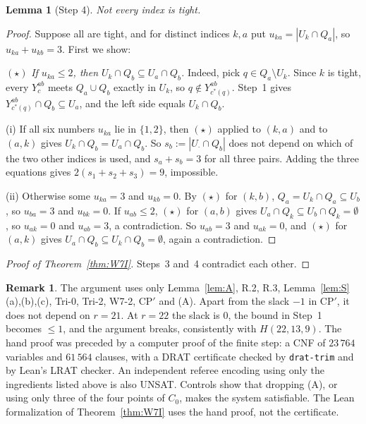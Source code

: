 \documentclass[11pt]{amsart}
\newtheorem{lemma}[theorem]{Lemma}
\theoremstyle{definition}
\newtheorem{remark}[theorem]{Remark}
\begin{document}
\begin{lemma}[Step 4]\label{lem:step4}
Not every index is tight.
\end{lemma}
\begin{proof}
Suppose all are tight, and for distinct indices $k,a$ put $u_{ka}=|U_k\cap Q_a|$, so $u_{ka}+u_{kb}=3$. First we show:

$(\star)$ \emph{If $u_{ka}\le 2$, then $U_k\cap Q_b\subseteq U_a\cap Q_b$.} Indeed, pick $q\in Q_a\setminus U_k$. Since $k$ is tight, every $Y^{ab}_c$ meets $Q_a\cup Q_b$ exactly in $U_k$, so $q\notin Y^{ab}_{c^*(q)}$. Step~1 gives $Y^{ab}_{c^*(q)}\cap Q_b\subseteq U_a$, and the left side equals $U_k\cap Q_b$.

(i) If all six numbers $u_{ka}$ lie in $\{1,2\}$, then $(\star)$ applied to $(k,a)$ and to $(a,k)$ gives $U_k\cap Q_b=U_a\cap Q_b$. So $s_b:=|U_\cdot\cap Q_b|$ does not depend on which of the two other indices is used, and $s_a+s_b=3$ for all three pairs. Adding the three equations gives $2(s_1+s_2+s_3)=9$, impossible.

(ii) Otherwise some $u_{ka}=3$ and $u_{kb}=0$. By $(\star)$ for $(k,b)$, $Q_a=U_k\cap Q_a\subseteq U_b$, so $u_{ba}=3$ and $u_{bk}=0$. If $u_{ab}\le 2$, $(\star)$ for $(a,b)$ gives $U_a\cap Q_k\subseteq U_b\cap Q_k=\emptyset$, so $u_{ak}=0$ and $u_{ab}=3$, a contradiction. So $u_{ab}=3$ and $u_{ak}=0$, and $(\star)$ for $(a,k)$ gives $U_a\cap Q_b\subseteq U_k\cap Q_b=\emptyset$, again a contradiction.
\end{proof}

\begin{proof}[Proof of Theorem~\ref{thm:W7I}]
Steps~3 and~4 contradict each other.
\end{proof}

\begin{remark}
The argument uses only Lemma~\ref{lem:A}, R.2, R.3, Lemma~\ref{lem:S}(a),(b),(c), Tri-0, Tri-2, W7-2, CP$'$ and (A). Apart from the slack $-1$ in CP$'$, it does not depend on $r=21$. At $r=22$ the slack is $0$, the bound in Step~1 becomes $\le1$, and the argument breaks, consistently with $H(22,13,9)$. The hand proof was preceded by a computer proof of the finite step: a CNF of $23\,764$ variables and $61\,564$ clauses, with a DRAT certificate checked by \texttt{drat-trim} and by Lean's LRAT checker. An independent referee encoding using only the ingredients listed above is also UNSAT. Controls show that dropping (A), or using only three of the four points of $C_0$, makes the system satisfiable. The Lean formalization of Theorem~\ref{thm:W7I} uses the hand proof, not the certificate.
\end{remark}
\end{document}
